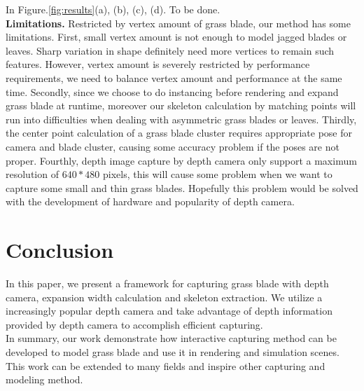 \documentclass[10pt,journal,compsoc]{IEEEtran}
\begin{document}
In Figure.\ref{fig:results}(a), (b), (c), (d). To be done.\\


\textbf{Limitations.} Restricted by vertex amount of grass blade, our method has some limitations. First, small vertex amount is not enough to model jagged blades or leaves. Sharp variation in shape definitely need more vertices to remain such features. However, vertex amount is severely restricted by performance requirements, we need to balance vertex amount and performance at the same time. Secondly, since we choose to do instancing before rendering and expand grass blade at runtime, moreover our skeleton calculation by matching points will run into difficulties when dealing with asymmetric grass blades or leaves. Thirdly, the center point calculation of a grass blade cluster requires appropriate pose for camera and blade cluster, causing some accuracy problem if the poses are not proper. Fourthly, depth image capture by depth camera only support a maximum resolution of $640*480$ pixels, this will cause some problem when we want to capture some small and thin grass blades. Hopefully this problem would be solved with the development of hardware and popularity of depth camera.

\section{Conclusion}
In this paper, we present a framework for capturing grass blade with depth camera, expansion width calculation and skeleton extraction. We utilize a increasingly popular depth camera and take advantage of depth information provided by depth camera to accomplish efficient capturing. \\

In summary, our work demonstrate how interactive capturing method can be developed to model grass blade and use it in rendering and simulation scenes. This work can be extended to many fields and inspire other capturing and modeling method.



\end{document}
